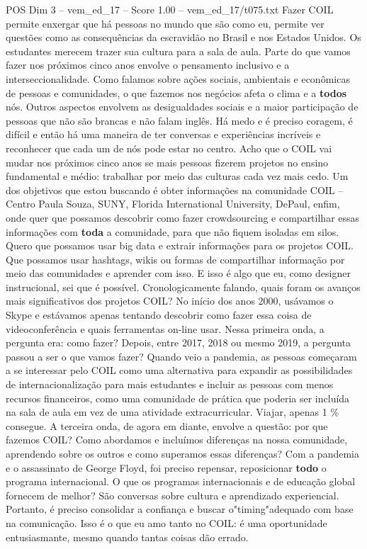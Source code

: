 \begin{textsample}{POS Dim 3 – vem\_ed\_17 – Score 1.00 – vem\_ed\_17/t075.txt}  \label{ex:f3_pos_063}
Fazer COIL permite enxergar que há pessoas no mundo que são como eu, permite ver questões como as consequências da escravidão no Brasil e nos Estados Unidos.
Os estudantes merecem trazer sua cultura para a sala de aula.
Parte do que vamos fazer nos próximos cinco anos envolve o pensamento inclusivo e a interseccionalidade.
Como falamos sobre ações sociais, ambientais e econômicas de pessoas e comunidades, o que fazemos nos negócios afeta o clima e a \textbf{todos} nós.
Outros aspectos envolvem as desigualdades sociais e a maior participação de pessoas que não são brancas e não falam inglês.
Há medo e é preciso coragem, é difícil e então há uma maneira de ter conversas e experiências incríveis e reconhecer que cada um de nós pode estar no centro.
Acho que o COIL vai mudar nos próximos cinco anos se mais pessoas fizerem projetos no ensino fundamental e médio: trabalhar por meio das culturas cada vez mais cedo.
Um dos objetivos que estou buscando é obter informações na comunidade COIL – Centro Paula Souza, SUNY, Florida International University, DePaul, enfim, onde quer que possamos descobrir como fazer crowdsourcing e compartilhar essas informações com \textbf{toda} a comunidade, para que não fiquem isoladas em silos.
Quero que possamos usar big data e extrair informações para os projetos COIL.
Que possamos usar hashtags, wikis ou formas de compartilhar informação por meio das comunidades e aprender com isso.
E isso é algo que eu, como designer instrucional, sei que é possível.
Cronologicamente falando, quais foram os avanços mais significativos dos projetos COIL?
No início dos anos 2000, usávamos o Skype e estávamos apenas tentando descobrir como fazer essa coisa de videoconferência e quais ferramentas on-line usar.
Nessa primeira onda, a pergunta era: como fazer?
Depois, entre 2017, 2018 ou mesmo 2019, a pergunta passou a ser o que vamos fazer?
Quando veio a pandemia, as pessoas começaram a se interessar pelo COIL como uma alternativa para expandir as possibilidades de internacionalização para mais estudantes e incluir as pessoas com menos recursos financeiros, como uma comunidade de prática que poderia ser incluída na sala de aula em vez de uma atividade extracurricular.
Viajar, apenas 1 \% consegue.
A terceira onda, de agora em diante, envolve a questão: por que fazemos COIL?
Como abordamos e incluímos diferenças na nossa comunidade, aprendendo sobre os outros e como superamos essas diferenças?
Com a pandemia e o assassinato de George Floyd, foi preciso repensar, reposicionar \textbf{todo} o programa internacional.
O que os programas internacionais e de educação global fornecem de melhor?
São conversas sobre cultura e aprendizado experiencial.
Portanto, é preciso consolidar a confiança e buscar o"timing"adequado com base na comunicação.
Isso é o que eu amo tanto no COIL: é uma oportunidade entusiasmante, mesmo quando tantas coisas dão errado.

\end{textsample}
